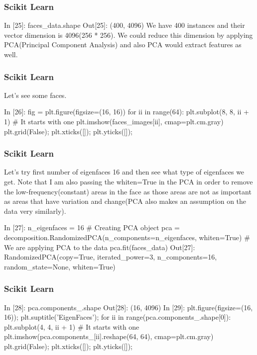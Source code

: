 \begin{frame}[fragile]
	\frametitle{Scikit Learn}
In [25]:
faces_data.shape
Out[25]:
(400, 4096)
We have 400 instances and their vector dimension is 4096(256 * 256). We could reduce this dimension by applying PCA(Principal Component Analysis) and also PCA would extract features as well.
\end{frame}
\begin{frame}[fragile]
	\frametitle{Scikit Learn}
Let's see some faces.

In [26]:
fig = plt.figure(figsize=(16, 16))
for ii in range(64):
    plt.subplot(8, 8, ii + 1) # It starts with one
    plt.imshow(faces_images[ii], cmap=plt.cm.gray)
    plt.grid(False);
    plt.xticks([]);
    plt.yticks([]);
\end{frame}
\begin{frame}[fragile]
	\frametitle{Scikit Learn}
Let's try first number of eigenfaces 16 and then see what type of eigenfaces we get. Note that I am also passing the whiten=True in the PCA in order to remove the low-frequency(constant) areas in the face as those areas are not as important as areas that have variation and change(PCA also makes an assumption on the data very similarly).

In [27]:
n_eigenfaces = 16
# Creating PCA object
pca = decomposition.RandomizedPCA(n_components=n_eigenfaces, whiten=True)
# We are applying PCA to the data
pca.fit(faces_data)
Out[27]:
RandomizedPCA(copy=True, iterated_power=3, n_components=16, random_state=None,
       whiten=True)
\end{frame}
\begin{frame}[fragile]
	\frametitle{Scikit Learn}
In [28]:
pca.components_.shape
Out[28]:
(16, 4096)
In [29]:
plt.figure(figsize=(16, 16));
plt.suptitle('EigenFaces');
for ii in range(pca.components_.shape[0]):
    plt.subplot(4, 4, ii + 1) # It starts with one
    plt.imshow(pca.components_[ii].reshape(64, 64), cmap=plt.cm.gray)
    plt.grid(False);
    plt.xticks([]);
    plt.yticks([]);
\end{frame}
